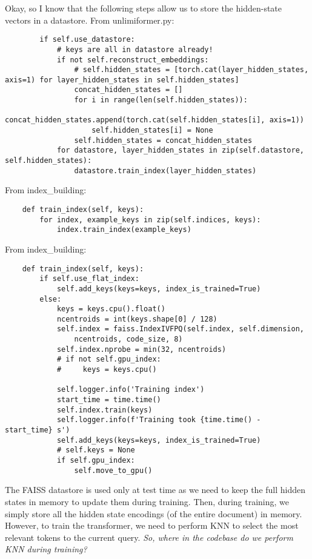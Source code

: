 \documentclass[12pt]{article}
\begin{document}
Okay, so I know that the following steps allow us to store the hidden-state
vectors in a datastore. From unlimiformer.py:

\begin{lstlisting}
        if self.use_datastore:
            # keys are all in datastore already!
            if not self.reconstruct_embeddings:
                # self.hidden_states = [torch.cat(layer_hidden_states, axis=1) for layer_hidden_states in self.hidden_states]
                concat_hidden_states = []
                for i in range(len(self.hidden_states)):
                    concat_hidden_states.append(torch.cat(self.hidden_states[i], axis=1))
                    self.hidden_states[i] = None
                self.hidden_states = concat_hidden_states
            for datastore, layer_hidden_states in zip(self.datastore, self.hidden_states):
                datastore.train_index(layer_hidden_states)
\end{lstlisting}

From index\_building:

\begin{lstlisting}
    def train_index(self, keys):
        for index, example_keys in zip(self.indices, keys):
            index.train_index(example_keys)
\end{lstlisting}

From index\_building:

\begin{lstlisting}
    def train_index(self, keys):
        if self.use_flat_index:
            self.add_keys(keys=keys, index_is_trained=True)
        else:
            keys = keys.cpu().float()
            ncentroids = int(keys.shape[0] / 128)
            self.index = faiss.IndexIVFPQ(self.index, self.dimension,
                ncentroids, code_size, 8)
            self.index.nprobe = min(32, ncentroids)
            # if not self.gpu_index:
            #     keys = keys.cpu()

            self.logger.info('Training index')
            start_time = time.time()
            self.index.train(keys)
            self.logger.info(f'Training took {time.time() - start_time} s')
            self.add_keys(keys=keys, index_is_trained=True)
            # self.keys = None
            if self.gpu_index:
                self.move_to_gpu()
              \end{lstlisting}

The FAISS datastore is used only at test time as we need to keep the full
hidden states in memory to update them during training. Then,
during training, we simply store all the hidden state encodings
(of the entire document)  in memory. However, to train the
transformer, we need to perform KNN to select the most relevant
tokens to the current query. \emph{So, where in the codebase do we perform
KNN during training?}
\end{document}
